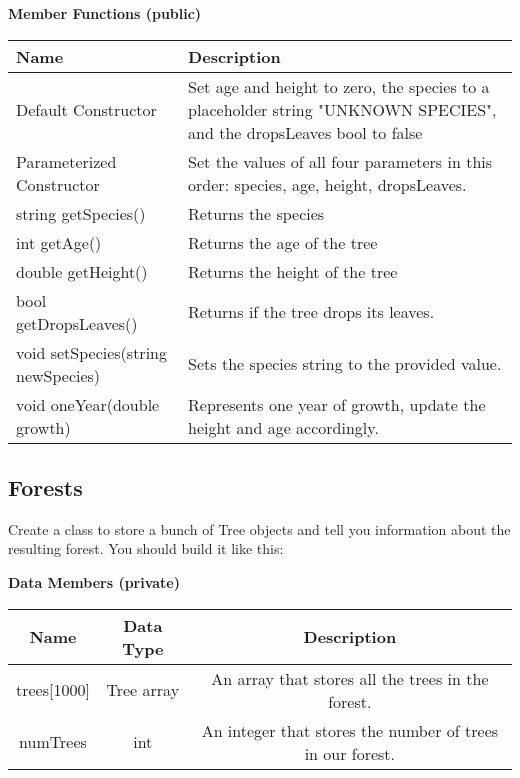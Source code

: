 \textbf{Member Functions (public)}
\begin{table}[H]
    \centering
    \begin{tabular}{p{2in}|p{4in}}
Name & Description \\ \hline
Default Constructor & Set age and height to zero, the species to a placeholder string "UNKNOWN SPECIES", and the dropsLeaves bool to false\\
Parameterized Constructor & Set the values of all four parameters in this order: species, age, height, dropsLeaves.\\
string getSpecies() & Returns the species \\
int getAge() & Returns the age of the tree \\
double getHeight() & Returns the height of the tree \\
bool getDropsLeaves() & Returns if the tree drops its leaves. \\
void setSpecies(string newSpecies) & Sets the species string to the provided value. \\
void oneYear(double growth) & Represents one year of growth, update the height and age accordingly. \\
    \end{tabular}
\end{table}


\subsection{Forests}
Create a class to store a bunch of Tree objects and tell you information about the resulting forest. You should build it like this:

\textbf{Data Members (private)}
\begin{table}[H]
    \centering
    \begin{tabular}{c|c|c}
Name & Data Type & Description \\ \hline
trees[1000] & Tree array & An array that stores all the trees in the forest. \\
numTrees & int & An integer that stores the number of trees in our forest. \\
    \end{tabular}
\end{table}

